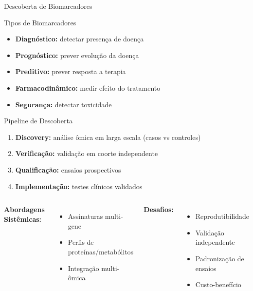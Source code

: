 \begin{frame}{Descoberta de Biomarcadores}
\begin{block}{Tipos de Biomarcadores}
\begin{itemize}
    \item \textbf{Diagnóstico:} detectar presença de doença
    \item \textbf{Prognóstico:} prever evolução da doença
    \item \textbf{Preditivo:} prever resposta a terapia
    \item \textbf{Farmacodinâmico:} medir efeito do tratamento
    \item \textbf{Segurança:} detectar toxicidade
\end{itemize}
\end{block}

\vspace{0.3cm}

\begin{exampleblock}{Pipeline de Descoberta}
\begin{enumerate}
    \item \textbf{Discovery:} análise ômica em larga escala (casos vs controles)
    \item \textbf{Verificação:} validação em coorte independente
    \item \textbf{Qualificação:} ensaios prospectivos
    \item \textbf{Implementação:} testes clínicos validados
\end{enumerate}
\end{exampleblock}

\begin{columns}
\textbf{Abordagens Sistêmicas:}
\begin{itemize}
    \item Assinaturas multi-gene
    \item Perfis de proteínas/metabólitos
    \item Integração multi-ômica
\end{itemize}

\textbf{Desafios:}
\begin{itemize}
    \item Reprodutibilidade
    \item Validação independente
    \item Padronização de ensaios
    \item Custo-benefício
\end{itemize}
\end{columns}
\end{frame}

